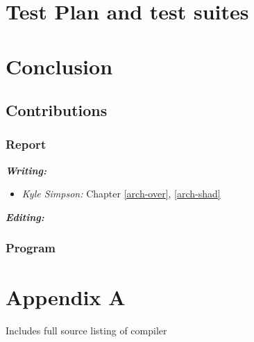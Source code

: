 \documentclass{l3proj}
\begin{document}
\chapter{Test Plan and test suites}
\label{test}

\chapter{Conclusion}
\label{conc}

\section{Contributions}
\label{cont}

\subsection{Report}
\label{cont-report}

\textit{\textbf{Writing:}}
\begin{itemize}
\item \emph{Kyle Simpson:} Chapter \ref{arch-over}, \ref{arch-shad}
\end{itemize}
\textit{\textbf{Editing:}}
\subsection{Program}
\label{cont-prog}

\chapter{Appendix A}
\label{appa}

Includes full source listing of compiler




\end{document}
